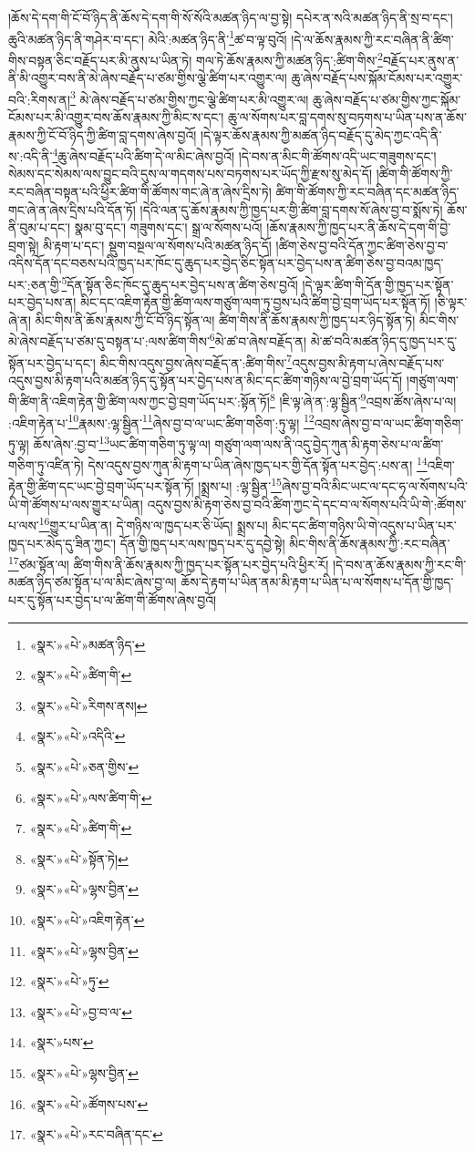 །ཆོས་དེ་དག་གི་ངོ་བོ་ཉིད་ནི་ཆོས་དེ་དག་གི་སོ་སོའི་མཚན་ཉིད་ལ་བྱ་སྟེ། དཔེར་ན་སའི་མཚན་ཉིད་ནི་སྲ་བ་དང་། ཆུའི་མཚན་ཉིད་ནི་གཤེར་བ་དང་། མེའི་:མཚན་ཉིད་ནི་\footnote{«སྣར་»«པེ་»མཚན་ཉིད་}ཚ་བ་ལྟ་བུའོ། །དེ་ལ་ཆོས་རྣམས་ཀྱི་རང་བཞིན་ནི་ཚིག་གིས་བསྟན་ཅིང་བརྗོད་པར་མི་ནུས་པ་ཡིན་ཏེ། གལ་ཏེ་ཆོས་རྣམས་ཀྱི་མཚན་ཉིད་:ཚིག་གིས་\footnote{«སྣར་»«པེ་»ཚིག་གི་}བརྗོད་པར་ནུས་ན་ནི་མི་འགྱུར་བས་ནི་མེ་ཞེས་བརྗོད་པ་ཙམ་གྱིས་ལྕེ་ཚིག་པར་འགྱུར་ལ། ཆུ་ཞེས་བརྗོད་པས་སྐོམ་ངོམས་པར་འགྱུར་བའི་:རིགས་ན།\footnote{«སྣར་»«པེ་»རིགས་ནས།} མེ་ཞེས་བརྗོད་པ་ཙམ་གྱིས་ཀྱང་ལྕེ་ཚིག་པར་མི་འགྱུར་ལ། ཆུ་ཞེས་བརྗོད་པ་ཙམ་གྱིས་ཀྱང་སྐོམ་ངོམས་པར་མི་འགྱུར་བས་ཆོས་རྣམས་ཀྱི་མིང་ས་དང་། ཆུ་ལ་སོགས་པར་བླ་དགས་སུ་བཏགས་པ་ཡིན་པས་ན་ཆོས་རྣམས་ཀྱི་ངོ་བོ་ཉིད་ཀྱི་ཚིག་བླ་དགས་ཞེས་བྱའོ། །དེ་ལྟར་ཆོས་རྣམས་ཀྱི་མཚན་ཉིད་བརྗོད་དུ་མེད་ཀྱང་འདི་ནི་ས་:འདི་ནི་\footnote{«སྣར་»«པེ་»འདིའི་}ཆུ་ཞེས་བརྗོད་པའི་ཚིག་དེ་ལ་མིང་ཞེས་བྱའོ། །དེ་བས་ན་མིང་གི་ཚོགས་འདི་ཡང་གཟུགས་དང་། སེམས་དང་སེམས་ལས་བྱུང་བའི་དུས་ལ་གདགས་པས་བཏགས་པར་ཡོད་ཀྱི་རྫས་སུ་མེད་དོ། །ཚིག་གི་ཚོགས་ཀྱི་རང་བཞིན་བསྟན་པའི་ཕྱིར་ཚིག་གི་ཚོགས་གང་ཞེ་ན་ཞེས་དྲིས་ཏེ། ཚིག་གི་ཚོགས་ཀྱི་རང་བཞིན་དང་མཚན་ཉིད་གང་ཞེ་ན་ཞེས་དྲིས་པའི་དོན་ཏོ། །དེའི་ལན་དུ་ཆོས་རྣམས་ཀྱི་ཁྱད་པར་གྱི་ཚིག་བླ་དགས་སོ་ཞེས་བྱ་བ་སྨོས་ཏེ། ཆོས་ནི་བུམ་པ་དང་། སྣམ་བུ་དང་། གཟུགས་དང་། སྒྲ་ལ་སོགས་པའོ། །ཆོས་རྣམས་ཀྱི་ཁྱད་པར་ནི་ཆོས་དེ་དག་གི་བྱེ་བྲག་སྟེ། མི་རྟག་པ་དང་། སྡུག་བསྔལ་ལ་སོགས་པའི་མཚན་ཉིད་དོ། །ཚིག་ཅེས་བྱ་བའི་དོན་ཀྱང་ཚིག་ཅེས་བྱ་བ་འདིས་དོན་དང་བཅས་པའི་ཁྱད་པར་ཁོང་དུ་ཆུད་པར་བྱེད་ཅིང་སྟོན་པར་བྱེད་པས་ན་ཚིག་ཅེས་བྱ་བའམ་ཁྱད་པར་:ཅན་གྱི་\footnote{«སྣར་»«པེ་»ཅན་གྱིས་}དོན་སྟོན་ཅིང་ཁོང་དུ་ཆུད་པར་བྱེད་པས་ན་ཚིག་ཅེས་བྱའོ། །དེ་ལྟར་ཚིག་གི་དོན་གྱི་ཁྱད་པར་སྟོན་པར་བྱེད་པས་ན། མིང་དང་འཇིག་རྟེན་གྱི་ཚིག་ལས་གཙུག་ལག་ཏུ་བྱས་པའི་ཚིག་བྱེ་བྲག་ཡོད་པར་སྟོན་ཏོ། །ཅི་ལྟར་ཞེ་ན། མིང་གིས་ནི་ཆོས་རྣམས་ཀྱི་ངོ་བོ་ཉིད་སྟོན་ལ། ཚིག་གིས་ནི་ཆོས་རྣམས་ཀྱི་ཁྱད་པར་ཉིད་སྟོན་ཏེ། མིང་གིས་མེ་ཞེས་བརྗོད་པ་ཙམ་དུ་བསྟན་པ་:ལས་ཚིག་གིས་\footnote{«སྣར་»«པེ་»ལས་ཚིག་གི་}མེ་ཚ་བ་ཞེས་བརྗོད་ན། མེ་ཚ་བའི་མཚན་ཉིད་དུ་ཁྱད་པར་དུ་སྟོན་པར་བྱེད་པ་དང་། མིང་གིས་འདུས་བྱས་ཞེས་བརྗོད་ན་:ཚིག་གིས་\footnote{«སྣར་»«པེ་»ཚིག་གི་}འདུས་བྱས་མི་རྟག་པ་ཞེས་བརྗོད་པས་འདུས་བྱས་མི་རྟག་པའི་མཚན་ཉིད་དུ་སྟོན་པར་བྱེད་པས་ན་མིང་དང་ཚིག་གཉིས་ལ་བྱེ་བྲག་ཡོད་དོ། །གཙུག་ལག་གི་ཚིག་ནི་འཇིག་རྟེན་གྱི་ཚིག་ལས་ཀྱང་བྱེ་བྲག་ཡོད་པར་:སྟོན་ཏོ།\footnote{«སྣར་»«པེ་»སྟོན་ཏེ།} །ཇི་ལྟ་ཞེ་ན་:ལྷ་སྦྱིན་\footnote{«སྣར་»«པེ་»ལྷས་བྱིན་}འབྲས་ཚོས་ཞེས་པ་ལ། :འཇིག་རྟེན་པ་\footnote{«སྣར་»«པེ་»འཇིག་རྟེན་}རྣམས་:ལྷ་སྦྱིན་\footnote{«སྣར་»«པེ་»ལྷས་བྱིན་}ཞེས་བྱ་བ་ལ་ཡང་ཚིག་གཅིག་:ཏུ་ལྟ། \footnote{«སྣར་»«པེ་»ཏུ་}འབྲས་ཞེས་བྱ་བ་ལ་ཡང་ཚིག་གཅིག་ཏུ་ལྟ། ཆོས་ཞེས་:བྱ་བ་\footnote{«སྣར་»«པེ་»བྱ་བ་ལ་}ཡང་ཚིག་གཅིག་ཏུ་ལྟ་ལ། གཙུག་ལག་ལས་ནི་འདུ་བྱེད་ཀུན་མི་རྟག་ཅེས་པ་ལ་ཚིག་གཅིག་ཏུ་འཛིན་ཏེ། དེས་འདུས་བྱས་ཀུན་མི་རྟག་པ་ཡིན་ཞེས་ཁྱད་པར་གྱི་དོན་སྟོན་པར་བྱེད་:པས་ན། \footnote{«སྣར་»པས་}འཇིག་རྟེན་གྱི་ཚིག་དང་ཡང་བྱེ་བྲག་ཡོད་པར་སྟོན་ཏོ། །སྨྲས་པ། :ལྷ་སྦྱིན་\footnote{«སྣར་»«པེ་»ལྷས་བྱིན་}ཞེས་བྱ་བའི་མིང་ཡང་ལ་དང་ཧ་ལ་སོགས་པའི་ཡི་གེ་ཚོགས་པ་ལས་གྱུར་པ་ཡིན། འདུས་བྱས་མི་རྟག་ཅེས་བྱ་བའི་ཚིག་ཀྱང་དེ་དང་བ་ལ་སོགས་པའི་ཡི་གེ་:ཚོགས་པ་ལས་\footnote{«སྣར་»«པེ་»ཚོགས་པས་}གྱུར་པ་ཡིན་ན། དེ་གཉིས་ལ་ཁྱད་པར་ཅི་ཡོད། སྨྲས་པ། མིང་དང་ཚིག་གཉིས་ཡི་གེ་འདུས་པ་ཡིན་པར་ཁྱད་པར་མེད་དུ་ཟིན་ཀྱང་། དོན་གྱི་ཁྱད་པར་ལས་ཁྱད་པར་དུ་དབྱེ་སྟེ། མིང་གིས་ནི་ཆོས་རྣམས་ཀྱི་:རང་བཞིན་\footnote{«སྣར་»«པེ་»རང་བཞིན་དང་}ཙམ་སྟོན་ལ། ཚིག་གིས་ནི་ཆོས་རྣམས་ཀྱི་ཁྱད་པར་སྟོན་པར་བྱེད་པའི་ཕྱིར་རོ། །དེ་བས་ན་ཆོས་རྣམས་ཀྱི་རང་གི་མཚན་ཉིད་ཙམ་སྟོན་པ་ལ་མིང་ཞེས་བྱ་ལ། ཆོས་དེ་རྟག་པ་ཡིན་ནམ་མི་རྟག་པ་ཡིན་པ་ལ་སོགས་པ་དོན་གྱི་ཁྱད་པར་དུ་སྟོན་པར་བྱེད་པ་ལ་ཚིག་གི་ཚོགས་ཞེས་བྱའོ། 